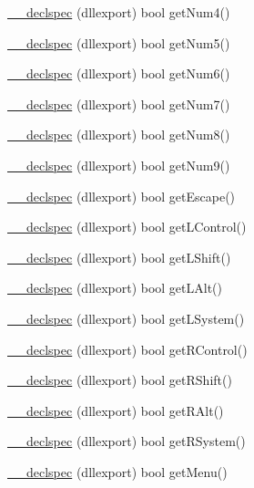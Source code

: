 \begin{DoxyCompactItemize}
\hyperlink{class_update_data_a056c88edc204dc0249eec22b00dcfc79}{\-\_\-\-\_\-declspec} (dllexport) bool get\-Num4()
\item 
\hyperlink{class_update_data_a1df1aae7e9dc67d8811d3b1d7c96f64e}{\-\_\-\-\_\-declspec} (dllexport) bool get\-Num5()
\item 
\hyperlink{class_update_data_a4d3a68d69d37635d029aafcd92da7d96}{\-\_\-\-\_\-declspec} (dllexport) bool get\-Num6()
\item 
\hyperlink{class_update_data_a7615115946e53a42dafccb42a66516d4}{\-\_\-\-\_\-declspec} (dllexport) bool get\-Num7()
\item 
\hyperlink{class_update_data_a3739ee314da99a10e46b40510e69ddb9}{\-\_\-\-\_\-declspec} (dllexport) bool get\-Num8()
\item 
\hyperlink{class_update_data_a76599542414294cb0a24fe67cb25adc4}{\-\_\-\-\_\-declspec} (dllexport) bool get\-Num9()
\item 
\hyperlink{class_update_data_a9a759da80a8df49d8db4dcca5da9abdb}{\-\_\-\-\_\-declspec} (dllexport) bool get\-Escape()
\item 
\hyperlink{class_update_data_a9bdb221985653e256c0f7ddeeb003cbf}{\-\_\-\-\_\-declspec} (dllexport) bool get\-L\-Control()
\item 
\hyperlink{class_update_data_ac1d3a01b39044b94f30b367c09b6bff9}{\-\_\-\-\_\-declspec} (dllexport) bool get\-L\-Shift()
\item 
\hyperlink{class_update_data_a0e425411e24f93654c66827ea4557bd6}{\-\_\-\-\_\-declspec} (dllexport) bool get\-L\-Alt()
\item 
\hyperlink{class_update_data_a0264a1b433c98dc7da78f1ba2354719a}{\-\_\-\-\_\-declspec} (dllexport) bool get\-L\-System()
\item 
\hyperlink{class_update_data_a25b3cf071c08d76f1e3311af8231956d}{\-\_\-\-\_\-declspec} (dllexport) bool get\-R\-Control()
\item 
\hyperlink{class_update_data_a7aeee9399285c897c213a75b71d0a6cb}{\-\_\-\-\_\-declspec} (dllexport) bool get\-R\-Shift()
\item 
\hyperlink{class_update_data_a5e3a55eb0a5ec255030989827c675b27}{\-\_\-\-\_\-declspec} (dllexport) bool get\-R\-Alt()
\item 
\hyperlink{class_update_data_a112e834988e5031c76d417612ec99a3b}{\-\_\-\-\_\-declspec} (dllexport) bool get\-R\-System()
\item 
\hyperlink{class_update_data_aeef92e09df8a6904f0db096fe7be69fd}{\-\_\-\-\_\-declspec} (dllexport) bool get\-Menu()
\item 

\end{DoxyCompactItemize}
